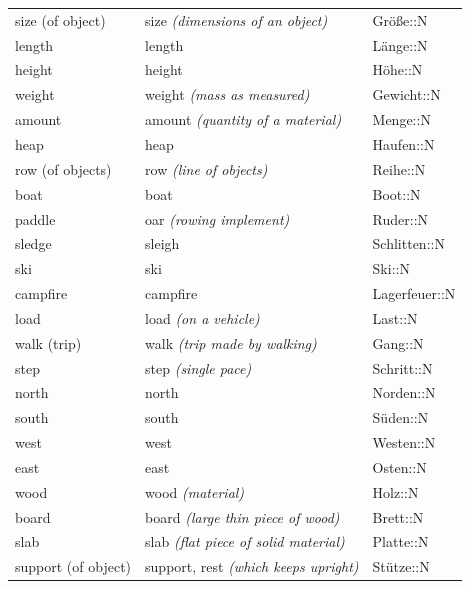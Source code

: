 \begin{center}
\begin{longtable}{lll}
{\sc \lowercase{	SIZE \footnotesize (OF OBJECT)	}}	&	size	\textit{\footnotesize (dimensions of an object)}	&	Größe::N	\\
{\sc \lowercase{	LENGTH	}}	&	length		&	Länge::N	\\
{\sc \lowercase{	HEIGHT	}}	&	height		&	Höhe::N	\\
{\sc \lowercase{	WEIGHT	}}	&	weight	\textit{\footnotesize (mass as measured)}	&	Gewicht::N	\\
{\sc \lowercase{	AMOUNT	}}	&	amount	\textit{\footnotesize (quantity of a material)}	&	Menge::N	\\
{\sc \lowercase{	HEAP	}}	&	heap		&	Haufen::N	\\
{\sc \lowercase{	ROW \footnotesize (OF OBJECTS)	}}	&	row	\textit{\footnotesize (line of objects)}	&	Reihe::N	\\
{\sc \lowercase{	BOAT	}}	&	boat		&	Boot::N	\\
{\sc \lowercase{	PADDLE	}}	&	oar	\textit{\footnotesize (rowing implement)}	&	Ruder::N	\\
{\sc \lowercase{	SLEDGE	}}	&	sleigh		&	Schlitten::N	\\
{\sc \lowercase{	SKI	}}	&	ski		&	Ski::N	\\
{\sc \lowercase{	CAMPFIRE	}}	&	campfire		&	Lagerfeuer::N	\\
{\sc \lowercase{	LOAD	}}	&	load	\textit{\footnotesize (on a vehicle)}	&	Last::N	\\
{\sc \lowercase{	WALK \footnotesize (TRIP)	}}	&	walk	\textit{\footnotesize (trip made by walking)}	&	Gang::N	\\
{\sc \lowercase{	STEP	}}	&	step	\textit{\footnotesize (single pace)}	&	Schritt::N	\\
{\sc \lowercase{	NORTH	}}	&	north		&	Norden::N	\\
{\sc \lowercase{	SOUTH	}}	&	south		&	Süden::N	\\
{\sc \lowercase{	WEST	}}	&	west		&	Westen::N	\\
{\sc \lowercase{	EAST	}}	&	east		&	Osten::N	\\
{\sc \lowercase{	WOOD	}}	&	wood	\textit{\footnotesize (material)}	&	Holz::N	\\
{\sc \lowercase{	BOARD	}}	&	board	\textit{\footnotesize (large thin piece of wood)}	&	Brett::N	\\
{\sc \lowercase{	SLAB	}}	&	slab	\textit{\footnotesize (flat piece of solid material)}	&	Platte::N	\\
{\sc \lowercase{	SUPPORT \footnotesize (OF OBJECT)	}}	&	support, rest	\textit{\footnotesize (which keeps upright)}	&	Stütze::N	\\

\end{longtable}
\end{center}
